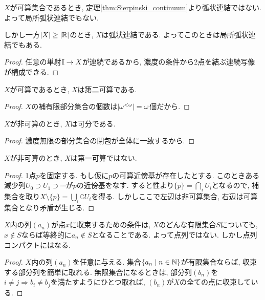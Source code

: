 \documentclass[uplatex, dvipdfmx, a4paper, 12pt, class=jsbook, crop=false]{standalone}
\begin{document}
\begin{property}
	$ X $が可算集合であるとき, 定理\ref{thm:Sierpinski_continuum}より弧状連結ではない. よって局所弧状連結でもない. 
\end{property}

\begin{property}
	しかし一方$ \left|X\right| \geq \left|\mathbb{R}\right| $のとき, $ X $は弧状連結である. よってこのときは局所弧状連結でもある. 
\end{property}
\begin{proof}
	任意の単射$ \mathbb{I} \rightarrow X $が連続であるから, 濃度の条件から2点を結ぶ連続写像が構成できる.
\end{proof}

\begin{property}
	$ X $が可算であるとき, $ X $は第二可算である.
\end{property}
\begin{proof}
	$ X $の補有限部分集合の個数は$ \left|\omega^{< \omega}\right| = \omega $個だから.
\end{proof}

\begin{property}
	$ X $が非可算のとき, $ X $は可分である.
\end{property}
\begin{proof}
	濃度無限の部分集合の閉包が全体に一致するから.
\end{proof}

\begin{property}
	$ X $が非可算のとき, $ X $は第一可算ではない.
\end{property}
\begin{proof}
	1点$ p $を固定する. もし仮に$ p $の可算近傍基が存在したとする. このときある減少列$ U_0 \supset U_1 \supset \cdots $が$ p $の近傍基をなす. すると性より$ \{p\} = \bigcap_i U_i $となるので, 補集合を取り$ X \setminus \{p\} = \bigcup_i \complement U_i $を得る. しかしここで左辺は非可算集合, 右辺は可算集合となり矛盾が生じる.
\end{proof}

\begin{property}
	$ X $内の列$ (a_n) $が点$ x $に収束するための条件は, $ X $のどんな有限集合$ S $についても, $ x \not\in S $ならば等終的に$ a_n \not\in S $となることである. よって点列\Hausdorff ではない. しかし点列コンパクトにはなる.
\end{property}
\begin{proof}
	$ X $内の列$ (a_n) $を任意に与える. 集合$ \setcomp{a_n}{n \in \N} $が有限集合ならば, 収束する部分列を簡単に取れる. 無限集合になるときは, 部分列$ (b_n) $を$ i \neq j \Rightarrow b_i \neq b_j $を満たすようにひとつ取れば, $ (b_n) $が$ X $の全ての点に収束している.
\end{proof}
\end{document}
